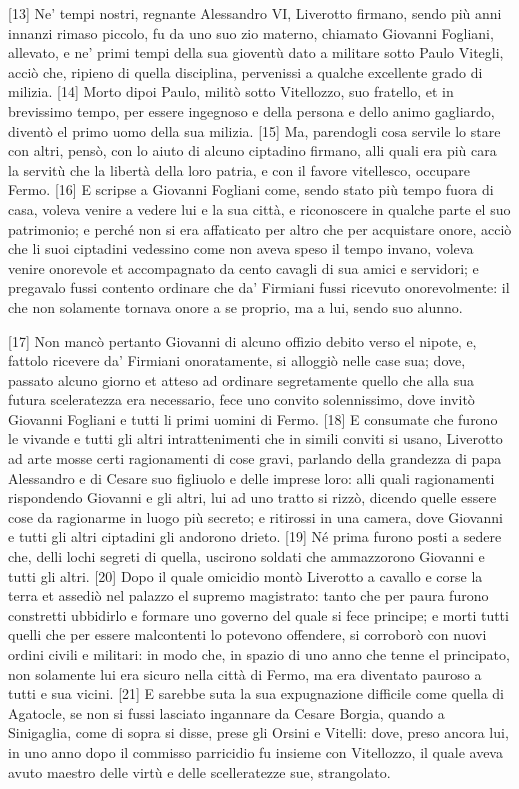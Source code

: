 {[}13{]} Ne' tempi nostri, regnante Alessandro VI, Liverotto firmano,
sendo più anni innanzi rimaso piccolo, fu da uno suo zio materno,
chiamato Giovanni Fogliani, allevato, e ne' primi tempi della sua
gioventù dato a militare sotto Paulo Vitegli, acciò che, ripieno di
quella disciplina, pervenissi a qualche excellente grado di milizia.
{[}14{]} Morto dipoi Paulo, militò sotto Vitellozzo, suo fratello, et in
brevissimo tempo, per essere ingegnoso e della persona e dello animo
gagliardo, diventò el primo uomo della sua milizia. {[}15{]} Ma,
parendogli cosa servile lo stare con altri, pensò, con lo aiuto di
alcuno ciptadino firmano, alli quali era più cara la servitù che la
libertà della loro patria, e con il favore vitellesco, occupare Fermo.
{[}16{]} E scripse a Giovanni Fogliani come, sendo stato più tempo fuora
di casa, voleva venire a vedere lui e la sua città, e riconoscere in
qualche parte el suo patrimonio; e perché non si era affaticato per
altro che per acquistare onore, acciò che li suoi ciptadini vedessino
come non aveva speso il tempo invano, voleva venire onorevole et
accompagnato da cento cavagli di sua amici e servidori; e pregavalo
fussi contento ordinare che da' Firmiani fussi ricevuto onorevolmente:
il che non solamente tornava onore a se proprio, ma a lui, sendo suo
alunno.

{[}17{]} Non mancò pertanto Giovanni di alcuno offizio debito verso el
nipote, e, fattolo ricevere da' Firmiani onoratamente, si alloggiò nelle
case sua; dove, passato alcuno giorno et atteso ad ordinare segretamente
quello che alla sua futura sceleratezza era necessario, fece uno convito
solennissimo, dove invitò Giovanni Fogliani e tutti li primi uomini di
Fermo. {[}18{]} E consumate che furono le vivande e tutti gli altri
intrattenimenti che in simili conviti si usano, Liverotto ad arte mosse
certi ragionamenti di cose gravi, parlando della grandezza di papa
Alessandro e di Cesare suo figliuolo e delle imprese loro: alli quali
ragionamenti rispondendo Giovanni e gli altri, lui ad uno tratto si
rizzò, dicendo quelle essere cose da ragionarme in luogo più secreto; e
ritirossi in una camera, dove Giovanni e tutti gli altri ciptadini gli
andorono drieto. {[}19{]} Né prima furono posti a sedere che, delli
lochi segreti di quella, uscirono soldati che ammazzorono Giovanni e
tutti gli altri. {[}20{]} Dopo il quale omicidio montò Liverotto a
cavallo e corse la terra et assediò nel palazzo el supremo magistrato:
tanto che per paura furono constretti ubbidirlo e formare uno governo
del quale si fece principe; e morti tutti quelli che per essere
malcontenti lo potevono offendere, si corroborò con nuovi ordini civili
e militari: in modo che, in spazio di uno anno che tenne el principato,
non solamente lui era sicuro nella città di Fermo, ma era diventato
pauroso a tutti e sua vicini. {[}21{]} E sarebbe suta la sua
expugnazione difficile come quella di Agatocle, se non si fussi lasciato
ingannare da Cesare Borgia, quando a Sinigaglia, come di sopra si disse,
prese gli Orsini e Vitelli: dove, preso ancora lui, in uno anno dopo il
commisso parricidio fu insieme con Vitellozzo, il quale aveva avuto
maestro delle virtù e delle scelleratezze sue, strangolato.

